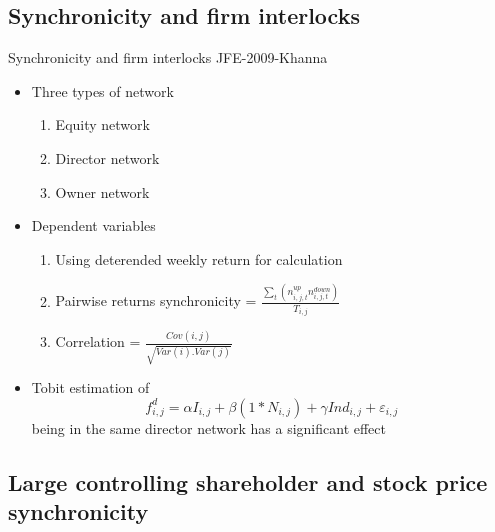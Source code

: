 \documentclass[handout]{beamer}
\begin{document}
	\subsection{Synchronicity and firm interlocks}
	\begin{frame}{Synchronicity and firm interlocks }{JFE-2009-Khanna} \label{ref1}
		\begin{itemize}
			\item Three types of network
			\begin{enumerate}
				\item Equity network \item Director network \item Owner network
			\end{enumerate}
			\item Dependent variables
			\begin{enumerate}
				\item[] Using deterended weekly return for calculation
				\item Pairwise returns synchronicity = $\frac{\sum_t (n^{up}_{i,j,t} 
					n^{down}_{i,j,t})}{T_{i,j}}$
				\item Correlation = $\frac{Cov(i,j)}{\sqrt{Var(i).Var(j)}}$
			\end{enumerate}
			\item Tobit estimation of
			\begin{equation*}
				f^d_{i,j} = \alpha I_{i,j} + \beta (1*N_{i,j}) + \gamma Ind_{i,j} + \varepsilon_{i,j}
			\end{equation*}
			being in the same director network has a significant effect
		\end{itemize}
	\end{frame}
	
	
	\subsection{Large controlling shareholder and stock price synchronicity}
	
\end{document}
